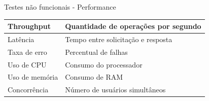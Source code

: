 \begin{frame}{Testes não funcionais - Performance}
\begin{table}[H]
\begin{tabular}{|p{4.0cm}|p{4.5cm}|}
Throughput &
Quantidade de operações por segundo \\
\hline

Latência &
Tempo entre solicitação e resposta \\
\hline

Taxa de erro &
Percentual de falhas \\
\hline

Uso de CPU &
Consumo do processador \\
\hline

Uso de memória &
Consumo de RAM \\
\hline

Concorrência &
Número de usuários simultâneos \\
\hline

\end{tabular}
\end{table}

\end{frame}